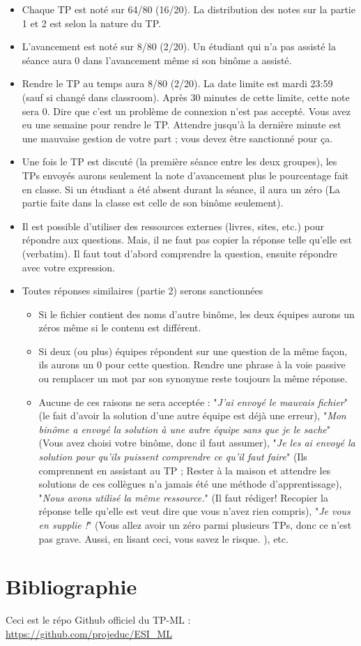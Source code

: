 \documentclass[11pt, a4paper]{article}
\begin{document}
\begin{itemize}
	\item Chaque TP est noté sur 64/80 (16/20). La distribution des notes sur la partie 1 et 2 est selon la nature du TP.
	\item L'avancement est noté sur 8/80 (2/20). 
	Un étudiant qui n'a pas assisté la séance aura 0 dans l'avancement même si son binôme a assisté.
	\item Rendre le TP au temps aura 8/80 (2/20). 
	La date limite est mardi 23:59 (sauf si changé dans classroom).
	Après 30 minutes de cette limite, cette note sera 0.
	Dire que c'est un problème de connexion n'est pas accepté. 
	Vous avez eu une semaine pour rendre le TP.
	Attendre jusqu'à la dernière minute est une mauvaise gestion de votre part ; vous devez être sanctionné pour ça. 
	\item Une fois le TP est discuté (la première séance entre les deux groupes), les TPs envoyés aurons seulement la note d'avancement plus le pourcentage fait en classe.
	Si un étudiant a été absent durant la séance, il aura un zéro (La partie faite dans la classe est celle de son binôme seulement).
	\item Il est possible d'utiliser des ressources externes (livres, sites, etc.) pour répondre aux questions. 
	Mais, il ne faut pas copier la réponse telle qu'elle est (verbatim).
	Il faut tout d'abord comprendre la question, ensuite répondre avec votre expression. 
	\item Toutes réponses similaires (partie 2) serons sanctionnées
	\begin{itemize}
		\item Si le fichier contient des noms d'autre binôme, les deux équipes aurons un zéros même si le contenu est différent.
		\item Si deux (ou plus) équipes répondent sur une question de la même façon, ils aurons un 0 pour cette question.
		Rendre une phrase à la voie passive ou remplacer un mot par son synonyme reste toujours la même réponse.
		\item Aucune de ces raisons ne sera acceptée : "\textit{J'ai envoyé le mauvais fichier}" (le fait d'avoir la solution d'une autre équipe est déjà une erreur), "\textit{Mon binôme a envoyé la solution à une autre équipe sans que je le sache}" (Vous avez choisi votre binôme, donc il faut assumer), "\textit{Je les ai envoyé la solution pour qu'ils puissent comprendre ce qu'il faut faire}" (Ils comprennent en assistant au TP ; Rester à la maison et attendre les solutions de ces collègues n'a jamais été une méthode d'apprentissage), "\textit{Nous avons utilisé la même ressource.}" (Il faut rédiger! Recopier la réponse telle qu'elle est veut dire que vous n'avez rien compris), "\textit{Je vous en supplie !}" (Vous allez avoir un zéro parmi plusieurs TPs, donc ce n'est pas grave. Aussi, en lisant ceci, vous savez le risque. ), etc.
	\end{itemize}
\end{itemize}

\section{Bibliographie}

Ceci est le répo Github officiel du TP-ML : \url{https://github.com/projeduc/ESI_ML}

\nocite{*}




\end{document}
